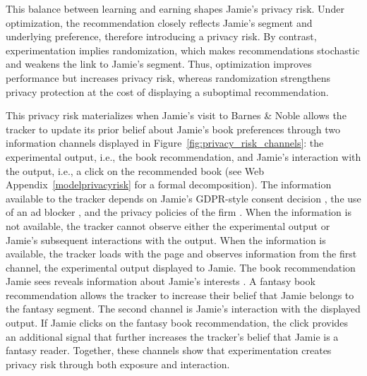 \documentclass[mksc,nonblindrev]{informs3}
\begin{document}
This balance between learning and earning shapes Jamie's privacy risk. Under optimization, the recommendation closely reflects Jamie’s segment and underlying preference, therefore introducing a privacy risk. By contrast, experimentation implies randomization, which makes recommendations stochastic and weakens the link to Jamie’s segment. Thus, optimization improves performance but increases privacy risk, whereas randomization strengthens privacy protection at the cost of displaying a suboptimal recommendation.

This privacy risk materializes when Jamie’s visit to Barnes \& Noble allows the tracker to update its prior belief about Jamie's book preferences through two information channels displayed in Figure~\ref{fig:privacy_risk_channels}: the experimental output, i.e., the book recommendation, and Jamie’s interaction with the output, i.e., a click on the recommended book (see Web Appendix~\ref{modelprivacyrisk} for a formal decomposition). The information available to the tracker depends on Jamie's GDPR-style consent decision \citep{Johnson_2020, Choi_2023}, the use of an ad blocker \citep{Todri_2022}, and the privacy policies of the firm \citep{Brough_2022}. When the information is not available, the tracker cannot observe either the experimental output or Jamie’s subsequent interactions with the output. When the information is available, the tracker loads with the page and observes information from the first channel, the experimental output displayed to Jamie. The book recommendation Jamie sees reveals information about Jamie’s interests \citep[e.g., see][]{Summers_2016,Kim_2018}. A fantasy book recommendation allows the tracker to increase their belief that Jamie belongs to the fantasy segment. The second channel is Jamie’s interaction with the displayed output. If Jamie clicks on the fantasy book recommendation, the click provides an additional signal that further increases the tracker’s belief that Jamie is a fantasy reader. Together, these channels show that experimentation creates privacy risk through both exposure and interaction.

\end{document}
